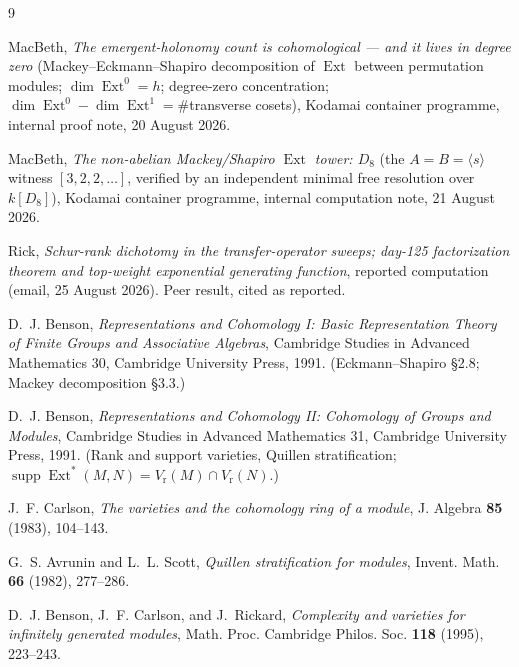 \documentclass[11pt]{amsart}
\theoremstyle{plain}
\theoremstyle{definition}
\DeclareMathOperator{\Ext}{Ext}
\DeclareMathOperator{\supp}{supp}
\newcommand{\Vr}{V_{\mathrm{r}}}
\begin{document}
\begin{thebibliography}{9}

MacBeth,
\emph{The emergent-holonomy count is cohomological --- and it lives in degree zero}
(Mackey--Eckmann--Shapiro decomposition of $\Ext$ between permutation modules;
$\dim\Ext^0=h$; degree-zero concentration; $\dim\Ext^0-\dim\Ext^1=\#$transverse cosets),
Kodamai container programme, internal proof note, 20 August 2026.

MacBeth,
\emph{The non-abelian Mackey/Shapiro $\Ext$ tower: $D_8$}
(the $A=B=\langle s\rangle$ witness $[3,2,2,\dots]$, verified by an independent minimal free
resolution over $k[D_8]$),
Kodamai container programme, internal computation note, 21 August 2026.

Rick,
\emph{Schur-rank dichotomy in the transfer-operator sweeps; day-125 factorization theorem and
top-weight exponential generating function},
reported computation (email, 25 August 2026). Peer result, cited as reported.

D.~J. Benson,
\emph{Representations and Cohomology I: Basic Representation Theory of Finite Groups and
Associative Algebras},
Cambridge Studies in Advanced Mathematics 30, Cambridge University Press, 1991.
(Eckmann--Shapiro \S2.8; Mackey decomposition \S3.3.)

D.~J. Benson,
\emph{Representations and Cohomology II: Cohomology of Groups and Modules},
Cambridge Studies in Advanced Mathematics 31, Cambridge University Press, 1991.
(Rank and support varieties, Quillen stratification;
$\supp\Ext^{*}(M,N)=\Vr(M)\cap\Vr(N)$.)

J.~F. Carlson,
\emph{The varieties and the cohomology ring of a module},
J. Algebra \textbf{85} (1983), 104--143.

G.~S. Avrunin and L.~L. Scott,
\emph{Quillen stratification for modules},
Invent. Math. \textbf{66} (1982), 277--286.

D.~J. Benson, J.~F. Carlson, and J.~Rickard,
\emph{Complexity and varieties for infinitely generated modules},
Math. Proc. Cambridge Philos. Soc. \textbf{118} (1995), 223--243.

\end{thebibliography}
\end{document}
